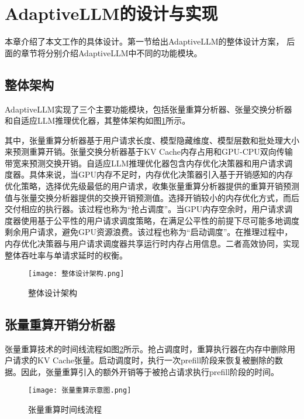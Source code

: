 \section{AdaptiveLLM的设计与实现}

本章介绍了本文工作的具体设计。第一节给出AdaptiveLLM的整体设计方案， 后面的章节将分别介绍AdaptiveLLM中不同的功能模块。

\subsection{整体架构}

AdaptiveLLM实现了三个主要功能模块，包括张量重算分析器、张量交换分析器和自适应LLM推理优化器，其整体架构如图\ref{Fig:整体设计架构}所示。

其中，张量重算分析器基于用户请求长度、模型隐藏维度、模型层数和批处理大小来预测重算开销。张量交换分析器基于KV Cache内存占用和GPU-CPU双向传输带宽来预测交换开销。自适应LLM推理优化器包含内存优化决策器和用户请求调度器。具体来说，当GPU内存不足时，内存优化决策器引入基于开销感知的内存优化策略，选择优先级最低的用户请求，收集张量重算分析器提供的重算开销预测值与张量交换分析器提供的交换开销预测值。选择开销较小的内存优化方式，而后交付相应的执行器。该过程也称为“抢占调度”。当GPU内存空余时，用户请求调度器使用基于公平性的用户请求调度策略，在满足公平性的前提下尽可能多地调度剩余用户请求，避免GPU资源浪费。该过程也称为“启动调度”。在推理过程中，内存优化决策器与用户请求调度器共享运行时内存占用信息。二者高效协同，实现整体吞吐率与单请求延时的权衡。

\begin{figure}[!htbp]
  \centering
  \texttt{[image: 整体设计架构.png]}
  \caption{整体设计架构}
  \label{Fig:整体设计架构}
\end{figure}

\subsection{张量重算开销分析器}

张量重算技术的时间线流程如图\ref{Fig:张量重算示意图}所示。抢占调度时，重算执行器在内存中删除用户请求的KV Cache张量。启动调度时，执行一次prefill阶段来恢复被删除的数据。因此，张量重算引入的额外开销等于被抢占请求执行prefill阶段的时间。

\begin{figure}[!htbp]
  \centering
  \texttt{[image: 张量重算示意图.png]}
  \caption{张量重算时间线流程}
  \label{Fig:张量重算示意图}
\end{figure}

